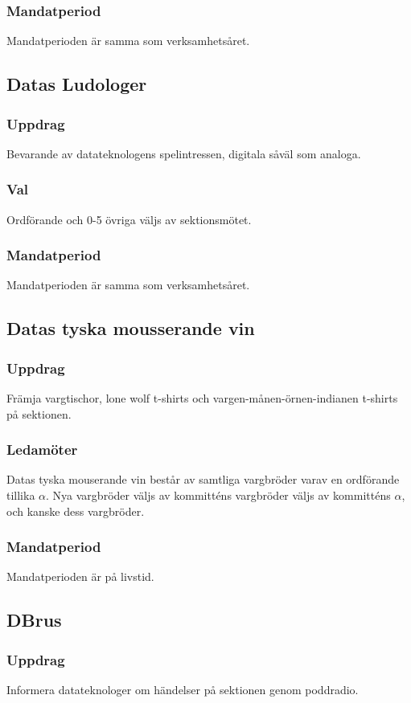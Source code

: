 \subsubsection{Mandatperiod}
Mandatperioden är samma som verksamhetsåret. 

\subsection{Datas Ludologer}
\subsubsection{Uppdrag}
Bevarande av datateknologens spelintressen, digitala såväl som analoga.
\subsubsection{Val}
Ordförande och 0-5 övriga väljs av sektionsmötet.
\subsubsection{Mandatperiod}
Mandatperioden är samma som verksamhetsåret. 

\subsection{Datas tyska mousserande vin}
\subsubsection{Uppdrag}
Främja vargtischor, lone wolf t-shirts och vargen-månen-örnen-indianen t-shirts på sektionen.
\subsubsection{Ledamöter}
Datas tyska mouserande vin består av samtliga vargbröder varav en ordförande tillika $\alpha$. Nya vargbröder väljs av kommitténs vargbröder väljs av kommitténs $\alpha$, och kanske dess vargbröder.
\subsubsection{Mandatperiod}
Mandatperioden är på livstid.

\subsection{DBrus}
\subsubsection{Uppdrag}
Informera datateknologer om händelser på sektionen genom poddradio.
